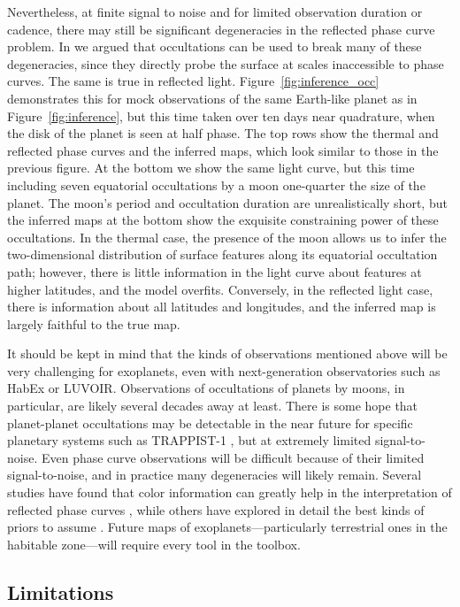 \documentclass[modern]{aastex62}
\begin{document}
Nevertheless, at finite signal to noise and for limited observation
duration or cadence, there may still be significant degeneracies in
the reflected phase curve problem. In \citet{Luger2019} we argued that
occultations can be used to break many of these degeneracies, since they
directly probe the surface at scales inaccessible to phase curves.
The same is true in reflected light. Figure~\ref{fig:inference_occ}
demonstrates this for mock observations of the same Earth-like
planet as in Figure~\ref{fig:inference}, but this time taken
over ten days near quadrature, when the disk of the planet is seen at
half phase. The top rows show the thermal and reflected phase
curves and the inferred maps, which look similar to those in
the previous figure.
At the bottom we show the same light curve, but this time including
seven equatorial occultations by a moon one-quarter the size of the planet.
The moon's period and occultation duration are unrealistically short, but
the inferred maps at the bottom show the exquisite constraining power of these
occultations.
In the thermal case, the presence of the moon allows us to infer the
two-dimensional distribution of surface features along its equatorial
occultation path; however, there is little information
in the light curve about features at higher latitudes, and the \starry model
overfits. Conversely, in the reflected light case, there is information
about all latitudes and longitudes, and the inferred map is
largely faithful to the true map.

It should be kept in mind that the kinds of observations
mentioned above will be very challenging for exoplanets, even with
next-generation observatories such as HabEx or LUVOIR. Observations of
occultations of planets by moons, in particular, are likely several decades
away at least. There is some hope that planet-planet occultations may
be detectable in the near future for specific planetary
systems such as TRAPPIST-1
\citep{Luger2019b}, but at extremely limited signal-to-noise.
Even phase curve observations will be difficult
because of their limited signal-to-noise, and in practice many
degeneracies will likely remain. Several studies have found
that color information can greatly help in the interpretation of
reflected phase curves , while others
have explored in detail the best kinds of priors to assume
\citep[e.g.,][]{Aizawa2020}. Future maps of exoplanets---particularly
terrestrial ones in the habitable zone---will require every tool
in the toolbox.

\subsection{Limitations}
\label{sec:limitations}
\end{document}
